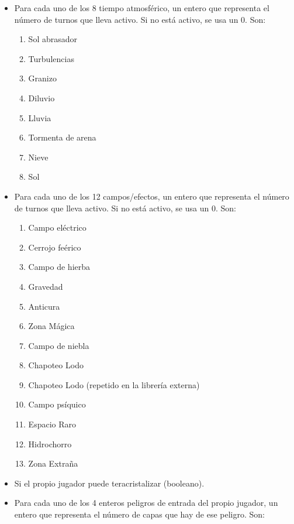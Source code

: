 \begin{itemize}
    \item Para cada uno de los 8 tiempo atmosférico, un entero que representa el número de turnos que lleva activo. Si no está activo, se usa un 0. Son:
          \begin{enumerate}
              \item Sol abrasador
              \item Turbulencias
              \item Granizo
              \item Diluvio
              \item Lluvia
              \item Tormenta de arena
              \item Nieve
              \item Sol
          \end{enumerate}
    \item Para cada uno de los 12 campos/efectos, un entero que representa el número de turnos que lleva activo. Si no está activo, se usa un 0. Son:
          \begin{enumerate}
              \item Campo eléctrico
              \item Cerrojo feérico
              \item Campo de hierba
              \item Gravedad
              \item Anticura
              \item Zona Mágica
              \item Campo de niebla
              \item Chapoteo Lodo
              \item Chapoteo Lodo (repetido en la librería externa)
              \item Campo psíquico
              \item Espacio Raro
              \item Hidrochorro
              \item Zona Extraña
          \end{enumerate}
    \item Si el propio jugador puede teracristalizar (booleano).
    \item Para cada uno de los 4 enteros peligros de entrada del propio jugador, un entero que representa el número de capas que hay de ese peligro. Son:
          \begin{enumerate}

\end{enumerate}
\end{itemize}
